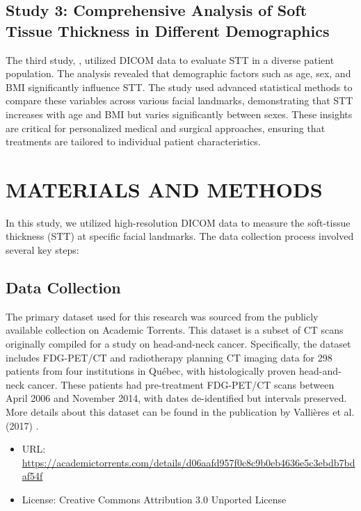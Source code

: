 \documentclass{article_saj}
\begin{document}
\subsection{Study 3: Comprehensive Analysis of Soft Tissue Thickness in Different Demographics}

The third study, \cite{b3}, utilized DICOM data to evaluate STT in a diverse patient population. The analysis revealed that demographic factors such as age, sex, and BMI significantly influence STT. The study used advanced statistical methods to compare these variables across various facial landmarks, demonstrating that STT increases with age and BMI but varies significantly between sexes. These insights are critical for personalized medical and surgical approaches, ensuring that treatments are tailored to individual patient characteristics.


\section{MATERIALS AND METHODS}

\indent

In this study, we utilized high-resolution DICOM data to measure the soft-tissue thickness (STT) at specific facial landmarks. The data collection process involved several key steps:

\subsection{Data Collection}

The primary dataset used for this research was sourced from the publicly available collection on Academic Torrents. This dataset is a subset of CT scans originally compiled for a study on head-and-neck cancer. Specifically, the dataset includes FDG-PET/CT and radiotherapy planning CT imaging data for 298 patients from four institutions in Québec, with histologically proven head-and-neck cancer. These patients had pre-treatment FDG-PET/CT scans between April 2006 and November 2014, with dates de-identified but intervals preserved. More details about this dataset can be found in the publication by Vallières et al. (2017) \cite{b4}.

\begin{itemize}
    \item URL: \url{https://academictorrents.com/details/d06aafd957f0c8c9b0eb4636e5c3ebdb7bdaf54f}
    \item License: Creative Commons Attribution 3.0 Unported License
\end{itemize}
\end{document}
